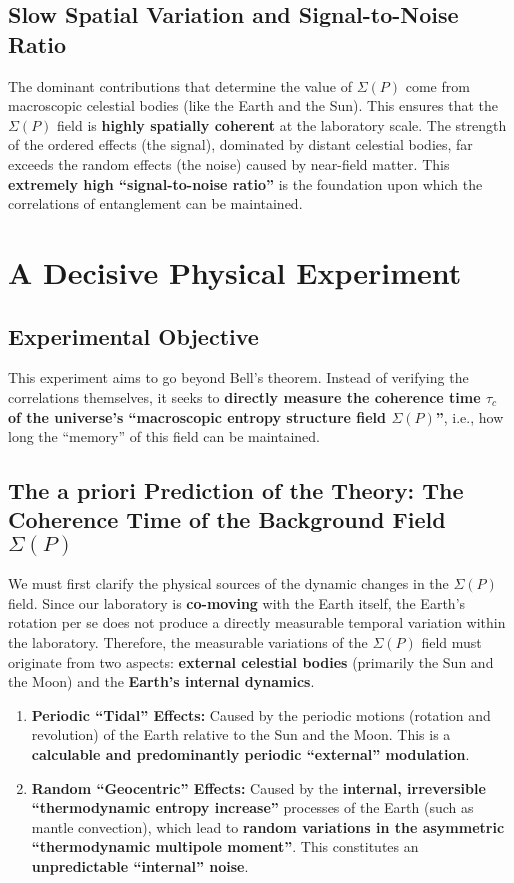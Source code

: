 \documentclass[11pt]{article}
\begin{document}
\subsection{Slow Spatial Variation and Signal-to-Noise Ratio}
The dominant contributions that determine the value of $\Sigma(P)$ come from macroscopic celestial bodies (like the Earth and the Sun). This ensures that the $\Sigma(P)$ field is \textbf{highly spatially coherent} at the laboratory scale. The strength of the ordered effects (the signal), dominated by distant celestial bodies, far exceeds the random effects (the noise) caused by near-field matter. This \textbf{extremely high ``signal-to-noise ratio''} is the foundation upon which the correlations of entanglement can be maintained.



\section{A Decisive Physical Experiment}

\subsection{Experimental Objective}
This experiment aims to go beyond Bell's theorem. Instead of verifying the correlations themselves, it seeks to \textbf{directly measure the coherence time $\tau_c$ of the universe's ``macroscopic entropy structure field $\Sigma(P)$''}, i.e., how long the ``memory'' of this field can be maintained.


\subsection{The a priori Prediction of the Theory: The Coherence Time of the Background Field $\Sigma(P)$}
We must first clarify the physical sources of the dynamic changes in the $\Sigma(P)$ field. Since our laboratory is \textbf{co-moving} with the Earth itself, the Earth's rotation per se does not produce a directly measurable temporal variation within the laboratory. Therefore, the measurable variations of the $\Sigma(P)$ field must originate from two aspects: \textbf{external celestial bodies} (primarily the Sun and the Moon) and the \textbf{Earth's internal dynamics}.
\begin{enumerate}
    \item   \textbf{Periodic ``Tidal'' Effects:} Caused by the periodic motions (rotation and revolution) of the Earth relative to the Sun and the Moon. This is a \textbf{calculable and predominantly periodic ``external'' modulation}.
    \item   \textbf{Random ``Geocentric'' Effects:} Caused by the \textbf{internal, irreversible ``thermodynamic entropy increase''} processes of the Earth (such as mantle convection), which lead to \textbf{random variations in the asymmetric ``thermodynamic multipole moment''}. This constitutes an \textbf{unpredictable ``internal'' noise}.
\end{enumerate}
\end{document}
